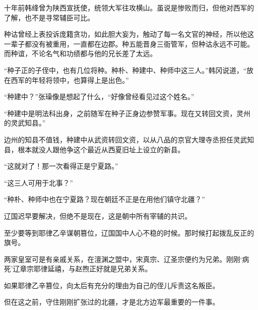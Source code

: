 十年前韩绛曾为陕西宣抚使，统领大军往攻横山。虽说是惨败而归，但他对西军的了解，也不是寻常辅臣可比。

种诂曾经上表投诉庞籍贪功，如此胆大妄为，触动了每一名文官的神经，所以他这一辈子都没有被重用，一直都在边郡。种五能晋身三衙管军，但种诂永远不可能。而种谊，不论名气和功绩都与他的兄长差了太远。

“种子正的子侄中，也有几位将种。种朴、种建中、种师中这三人。”韩冈说道，“放在西军的年轻将领中，也算得上是出色。”

“种建中？”张璪像是想起了什么，“好像曾经看见过这个姓名。”

“种建中是明法科出身，之前随军在种子正身边参赞军事。现在又转回文资，灵州的灵武知县。”

边州的知县不值钱，种建中从武资转回文资，以从八品的京官大理寺丞担任灵武知县，根本就没人跟他争这个最近从西夏旧址上设立的新县。

“这就对了！那一次看得正是宁夏路。”

“这三人可用于北事？”

“种朴、种师中也在宁夏路？现在朝廷不正是在用他们镇守北疆？”

辽国迟早要解决，但绝不是现在，这是朝中所有宰辅的共识。

至少要等到耶律乙辛谋朝篡位，辽国国中人心不稳的时候。那时候打起拨乱反正的旗号。

两家皇室可是有亲戚关系，在澶渊之盟中，宋真宗、辽圣宗便约为兄弟。刚刚‘病死’辽章宗耶律延禧，与赵煦正好就是兄弟关系。

如果耶律乙辛篡位，向太后有充分的理由为自己的侄儿斥责这名叛臣。

但在这之前，守住刚刚扩张过的北疆，才是北方边军最重要的一件事。
